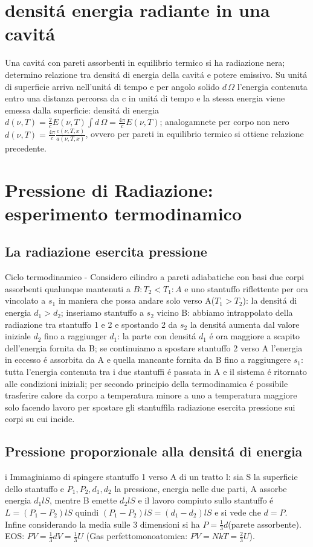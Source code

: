             \section{densit\'a energia radiante in una cavit\'a}
                Una cavit\'a con pareti assorbenti in equilibrio termico si ha radiazione nera; determino relazione tra densit\'a di energia della cavit\'a e potere emissivo. Su unit\'a di superficie arriva nell'unit\'a di tempo e per angolo solido $d\,\Omega$ l'energia contenuta entro una distanza percorsa da c in unit\'a di tempo e la stessa energia viene emessa dalla superficie: densit\'a di energia $d(\nu,T)=\frac{2}{c}E(\nu,T)\int d\,\Omega=\frac{4\pi}{c}E(\nu,T)$; analogamnete per corpo non nero $d(\nu,T)=\frac{4\pi}{c}\frac{e(\nu,T,x)}{a(\nu,T,x)}$, ovvero per pareti in equilibrio termico si ottiene relazione precedente.
        \section{Pressione di Radiazione: esperimento termodinamico}
            \subsection{La radiazione esercita pressione} 
                Ciclo termodinamico - Considero cilindro a  pareti adiabatiche con basi due corpi assorbenti qualunque mantenuti a $B:T_2<T_1:A$ e uno stantuffo riflettente per ora vincolato a $s_1$ in maniera che possa andare solo verso A($T_1>T_2$): la densit\'a di energia $d_1>d_2$; inseriamo stantuffo a $s_2$ vicino B: abbiamo intrappolato della radiazione tra stantuffo 1 e 2 e spostando 2 da $s_2$ la densit\'a aumenta dal valore iniziale $d_2$ fino a raggiunger $d_1$: la parte con densit\'a $d_1$ \'e ora maggiore a scapito dell'energia fornita da B; se continuiamo a spostare stantuffo 2 verso A l'energia in eccesso \'e assorbita da A e quella mancante fornita da B fino a raggiungere $s_1$: tutta l'energia contenuta tra i due stantuffi \'e passata in A e il sistema \'e ritornato alle condizioni iniziali; per secondo principio della termodinamica \'e possibile trasferire calore da corpo a temperatura minore a uno a temperatura maggiore solo facendo lavoro per spostare gli stantuffila radiazione esercita pressione sui corpi su cui incide.
            \subsection{Pressione proporzionale alla densit\'a di energia}i
                Immaginiamo di spingere stantuffo 1 verso  A di un tratto l: sia S la superficie dello stantuffo e $P_1,P_2,d_1,d_2$ la pressione, energia nelle due parti, A assorbe energia $d_1lS$, mentre B emette $d_2lS$ e il lavoro compiuto sullo stantuffo \'e $L=(P_1-P_2)lS$ quindi $(P_1-P_2)lS=(d_1-d_2)lS$ e si vede che $d=P$.
                Infine considerando la media sulle 3 dimensioni si ha $P=\frac{1}{3}d$(parete assorbente). EOS: $PV=\frac{1}{3}dV=\frac{1}{3}U$ (Gas perfettomonoatomica: $PV=NkT=\frac{2}{3}U$).
